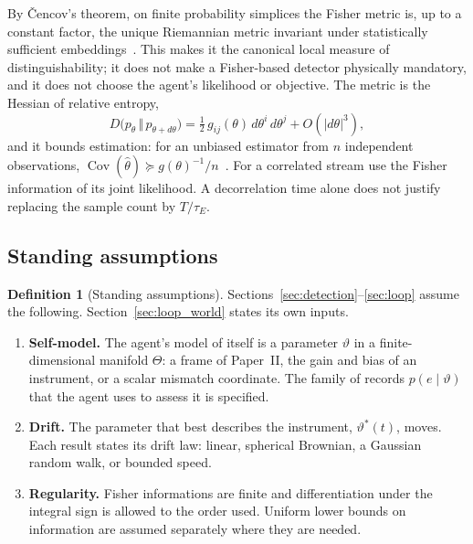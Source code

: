 \documentclass[12pt]{article}
\theoremstyle{definition}
\newtheorem{definition}[theorem]{Definition}
\begin{document}
By \v{C}encov's theorem, on finite probability simplices the Fisher metric is, up to a constant factor, the unique Riemannian metric invariant under statistically sufficient embeddings~\cite{Cencov1982}. This makes it the canonical local measure of distinguishability; it does not make a Fisher-based detector physically mandatory, and it does not choose the agent's likelihood or objective. The metric is the Hessian of relative entropy,
\begin{equation}
\label{eq:fisher_KL}
D\bigl(p_\theta\,\Vert\,p_{\theta+d\theta}\bigr)
=\tfrac12\,g_{ij}(\theta)\,d\theta^i\,d\theta^j+O(|d\theta|^3),
\end{equation}
and it bounds estimation: for an unbiased estimator from $n$ independent observations, $\operatorname{Cov}(\hat\theta)\succeq g(\theta)^{-1}/n$~\cite{Rao1945,CoverThomas2006}. For a correlated stream use the Fisher information of its joint likelihood. A decorrelation time alone does not justify replacing the sample count by $T/\tau_E$.

\subsection{Standing assumptions}
\label{subsec:standing_C}

\begin{definition}[Standing assumptions]
\label{def:assumptions_C}
Sections~\ref{sec:detection}--\ref{sec:loop} assume the following. Section~\ref{sec:loop_world} states its own inputs.
\begin{enumerate}
\item[\textup{(C1)}] \textbf{Self-model.} The agent's model of itself is a parameter $\vartheta$ in a finite-dimensional manifold $\Theta$: a frame of Paper~II, the gain and bias of an instrument, or a scalar mismatch coordinate. The family of records $p(e\mid\vartheta)$ that the agent uses to assess it is specified.
\item[\textup{(C2)}] \textbf{Drift.} The parameter that best describes the instrument, $\vartheta^*(t)$, moves. Each result states its drift law: linear, spherical Brownian, a Gaussian random walk, or bounded speed.
\item[\textup{(C3)}] \textbf{Regularity.} Fisher informations are finite and differentiation under the integral sign is allowed to the order used. Uniform lower bounds on information are assumed separately where they are needed.
\end{enumerate}
\end{definition}
\end{document}
